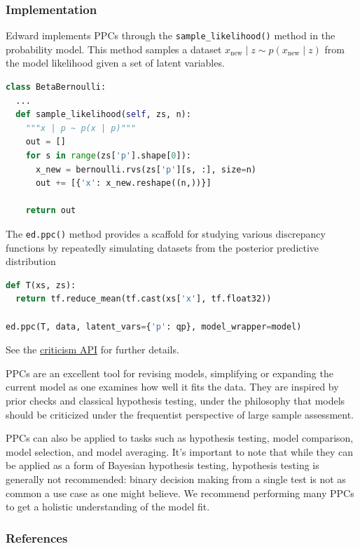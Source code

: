 \subsubsection{Implementation}

Edward implements PPCs through the \texttt{sample_likelihood()}
method in the probability model. This method samples a dataset
$x_{\text{new}}\mid z\sim p(x_{\text{new}}\mid z)$ from the
model likelihood given a set of latent variables.
\begin{lstlisting}[language=Python]
class BetaBernoulli:
  ...
  def sample_likelihood(self, zs, n):
    """x | p ~ p(x | p)"""
    out = []
    for s in range(zs['p'].shape[0]):
      x_new = bernoulli.rvs(zs['p'][s, :], size=n)
      out += [{'x': x_new.reshape((n,))}]

    return out
\end{lstlisting}

The \texttt{ed.ppc()} method provides a scaffold for studying
various discrepancy functions by repeatedly simulating datasets from the
posterior predictive distribution
\begin{lstlisting}[language=Python]
def T(xs, zs):
  return tf.reduce_mean(tf.cast(xs['x'], tf.float32))

ed.ppc(T, data, latent_vars={'p': qp}, model_wrapper=model)
\end{lstlisting}

See the \href{api/criticisms.html}{criticism API} for further details.

PPCs are an excellent tool for revising models, simplifying or
expanding the current model as one examines how well it fits the data.
They are inspired by prior checks and classical hypothesis
testing, under the philosophy that models should be
criticized under the frequentist perspective of large sample
assessment.

PPCs can also be applied to tasks such as hypothesis testing, model
comparison, model selection, and model averaging.  It's important to
note that while they can be applied as a form of Bayesian hypothesis
testing, hypothesis testing is generally not recommended: binary
decision making from a single test is not as common a use case as one
might believe. We recommend performing many PPCs to get a holistic
understanding of the model fit.

\subsubsection{References}\label{references}

